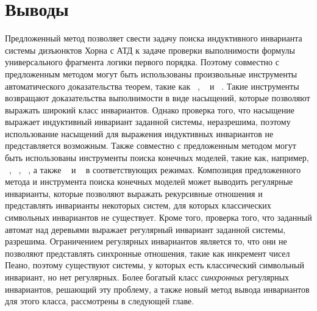 \section{Выводы}\label{sec:fmf/conclusion}
Предложенный метод позволяет свести задачу поиска индуктивного инварианта системы дизъюнктов Хорна с АТД к задаче проверки выполнимости формулы универсального фрагмента логики первого порядка.
Поэтому совместно с предложенным методом могут быть использованы произвольные инструменты автоматического доказательства теорем, такие как \vampire{}~\cite{kovacs2013first}, \eprover{}~\cite{10.5555/1218615.1218621} и \zipperposition{}~\cite{10.1007/978-3-319-66167-4_10}.
Такие инструменты возвращают доказательства выполнимости в виде насыщений, которые позволяют выражать широкий класс инвариантов. Однако проверка того, что насыщение выражает индуктивный инвариант заданной системы, неразрешима, поэтому использование насыщений для выражения индуктивных инвариантов не представляется возможным.
Также совместно с предложенным методом могут быть использованы инструменты поиска конечных моделей, такие как, например, \mace{}~\cite{https://doi.org/10.48550/arxiv.cs/0310055}, \kodkod{}~\cite{10.1007/978-3-540-71209-1_49}, \paradox{}~\cite{claessen2003new}, а также \cvc{}~\cite{reynolds2013finite} и \vampire{}~\cite{10.1007/978-3-319-40970-2_20} в соответствующих режимах. Композиция предложенного метода и инструмента поиска конечных моделей может выводить регулярные инварианты, которые позволяют выражать рекурсивные отношения и представлять инварианты некоторых систем, для которых классических символьных инвариантов не существует. Кроме того, проверка того, что заданный автомат над деревьями выражает регулярный инвариант заданной системы, разрешима.
Ограничением регулярных инвариантов является то, что они не позволяют представлять синхронные отношения, такие как инкремент чисел Пеано, поэтому существуют системы, у которых есть классический символьный инвариант, но нет регулярных.
Более богатый класс \emph{синхронных} регулярных инвариантов, решающий эту проблему, а также новый метод вывода инвариантов для этого класса, рассмотрены в следующей главе.

